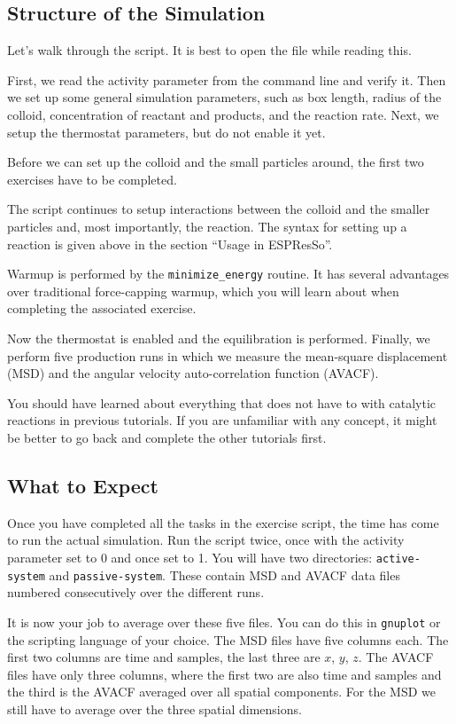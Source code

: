 \documentclass[aip,jcp,reprint,a4paper,onecolumn,nofootinbib,amsmath,amssymb]{revtex4-1}
\newcommand\code{\lstinline}
\newcommand{\es}{\mbox{\textsf{ESPResSo}}\xspace}
\newcommand\codees{\lstinline[language=python]}
\begin{document}
\subsection{Structure of the Simulation}

Let's walk through the script. It is best to open the file while reading this.

First, we read the activity parameter from the command line and verify it. Then we set up some general simulation parameters, such as box length, radius of the colloid, concentration of reactant and products, and the reaction rate. Next, we setup the thermostat parameters, but do not enable it yet.

Before we can set up the colloid and the small particles around, the first two exercises have to be completed.

The script continues to setup interactions between the colloid and the smaller particles and, most importantly, the reaction. The syntax for setting up a reaction is given above in the section ``Usage in \es''.

Warmup is performed by the \codees{minimize_energy} routine. It has several advantages over traditional force-capping warmup, which you will learn about when completing the associated exercise.

Now the thermostat is enabled and the equilibration is performed. Finally, we perform five production runs in which we measure the mean-square displacement (MSD) and the angular velocity auto-correlation function (AVACF).

You should have learned about everything that does not have to with catalytic reactions in previous tutorials. If you are unfamiliar with any concept, it might be better to go back and complete the other tutorials first.

\subsection{What to Expect}

Once you have completed all the tasks in the exercise script, the time has come to run the actual simulation. Run the script twice, once with the activity parameter set to 0 and once set to 1. You will have two directories: \code{active-system} and \code{passive-system}. These contain MSD and AVACF data files numbered consecutively over the
different runs.

It is now your job to average over these five files. You can do this in \code{gnuplot} or the scripting language of your choice. The MSD files have five columns each. The first two columns are time and samples, the last three are $x$, $y$, $z$. The AVACF files have only three columns, where the first two are also time and samples and the
third is the AVACF averaged over all spatial components. For the MSD we still have to average over the three spatial dimensions.
\end{document}

